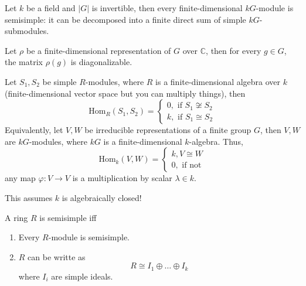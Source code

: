 \documentclass[openany]{book}
\newcommand{\C}{\mathbb{C}}
\begin{document}
\begin{prop}
    Let $k$ be a field and $|G|$ is invertible, then every finite-dimensional $kG$-module is semisimple: it can be decomposed into a finite direct sum of simple $kG$-submodules.
\end{prop}

\begin{prop}
    Let $\rho$ be a finite-dimensional representation of $G$ over $\C$, then for every $g\in G$, the matrix $\rho(g)$ is diagonalizable.
\end{prop}

\begin{prop}
    Let $S_1,S_2$ be simple $R$-modules, where $R$ is a finite-dimensional algebra over $k$ (finite-dimensional vector space but you can multiply things), then 
    \begin{equation*}
        \text{Hom}_R(S_1,S_2)=\begin{cases}
            0, \text{ if } S_1\not\cong S_2\\
            k, \text{ if } S_1\cong S_2
        \end{cases}
    \end{equation*}
    Equivalently, let $V,W$ be irreducible representations of a finite group $G$, then $V,W$ are $kG$-modules, where $kG$ is a finite-dimensional $k$-algebra. Thus,
    \begin{equation*}
        \text{Hom}_k(V,W)=\begin{cases}
            k, V\cong W\\
            0, \text{ if not}
        \end{cases}
    \end{equation*}
    any map $\varphi:V\to V$ is a multiplication by scalar $\lambda\in k$. 
    \begin{warn}
        This assumes $k$ is algebraically closed!
    \end{warn}
\end{prop}


\begin{defn}
    A ring $R$ is semisimple iff 
    \begin{enumerate}
        \item Every $R$-module is semisimple.
        \item $R$ can be writte as 
        \begin{equation*}
            R\cong I_1\oplus\dots\oplus I_k
        \end{equation*}
        where $I_i$ are simple ideals.
    \end{enumerate}
\end{defn}
\end{document}
